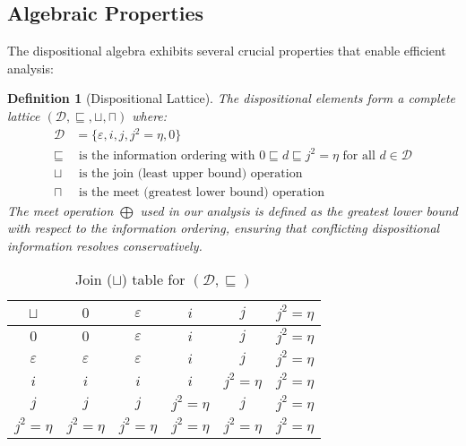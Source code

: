 \documentclass[acmsmall,anonymous,review,screen]{acmart}
\newtheorem{definition}{Definition}
\begin{document}
	\subsection{Algebraic Properties}
	
	The dispositional algebra exhibits several crucial properties that enable efficient analysis:
	
	\begin{definition}[Dispositional Lattice]
		The dispositional elements form a complete lattice $(\mathcal{D}, \sqsubseteq, \sqcup, \sqcap)$ where:
		\begin{align}
			\mathcal{D} &= \{\varepsilon, i, j, j^{2} = \eta, 0\} \\
			\sqsubseteq &\text{ is the information ordering with } 0 \sqsubseteq d \sqsubseteq j^{2} = \eta \text{ for all } d \in \mathcal{D} \\
			\sqcup &\text{ is the join (least upper bound) operation} \\
			\sqcap &\text{ is the meet (greatest lower bound) operation}
		\end{align}
		The meet operation $\bigoplus$ used in our analysis is defined as the greatest lower bound with respect to the information ordering, ensuring that conflicting dispositional information resolves conservatively.
	\end{definition}
\begin{table}[t]
    \centering
    \caption{Join ($\sqcup$) table for $(\mathcal{D},\sqsubseteq)$}
    \label{tab:join}
    \begin{tabular}{c|ccccc}
        \toprule
        $\sqcup$ & $0$ & $\varepsilon$ & $i$ & $j$ & $j^{2} = \eta$\\
        \midrule
        $0$ & $0$ & $\varepsilon$ & $i$ & $j$ & $j^{2} = \eta$\\
        $\varepsilon$ & $\varepsilon$ & $\varepsilon$ & $i$ & $j$ & $j^{2} = \eta$\\
        $i$ & $i$ & $i$ & $i$ & $j^{2} = \eta$ & $j^{2} = \eta$\\
        $j$ & $j$ & $j$ & $j^{2} = \eta$ & $j$ & $j^{2} = \eta$\\
        $j^{2} = \eta$ & $j^{2} = \eta$ & $j^{2} = \eta$ & $j^{2} = \eta$ & $j^{2} = \eta$ & $j^{2} = \eta$\\
        \bottomrule
    \end{tabular}
\end{table}
\end{document}
